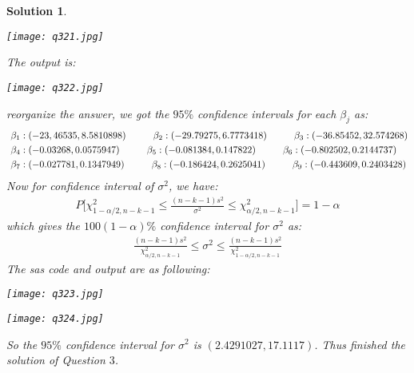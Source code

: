 \documentclass[11pt]{article}
\newtheorem{sol}{Solution}
\begin{document}
\begin{sol}
\begin{center}
		\texttt{[image: q321.jpg]}
	\end{center}
	The output is:
	\begin{center}
		\texttt{[image: q322.jpg]}
	\end{center}
	reorganize the answer, we got the $95\%$ confidence intervals for each $\beta_j$ as:
	\begin{align*}
		&\ \beta_1: (-23,46535, 8.5810898)\hskip 1cm \beta_2:  (-29.79275, 6.7773418) \hskip 1cm \beta_3: (-36.85452, 32.574268)\\
		&\ \beta_4: (-0.03268, 0.0575947)\hskip 1cm \beta_5: (-0.081384, 0.147822)\hskip 1cm 
		\beta_6: (-0.802502, 0.2144737)\\
		&\  \beta_7: (-0.027781, 0.1347949)\hskip 1cm \beta_8: (-0.186424, 0.2625041) \hskip 1cm \beta_9: (-0.443609, 0.2403428)
	\end{align*}
	Now for confidence interval of $\sigma^2$, we have:
	\begin{align*}
		P\Big[\chi^2_{1 - \alpha/2, n - k - 1}\leq \frac{(n - k - 1)s^2}{\sigma^2} \leq \chi^2_{\alpha/2, n - k - 1}\Big] = 1 - \alpha
	\end{align*}
	which gives the $100(1 - \alpha)\%$ confidence interval for $\sigma^2$ as:
	\begin{align*}
		\frac{(n - k - 1)s^2}{\chi^2_{\alpha/2, n - k - 1}} \leq \sigma^2 \leq \frac{(n -  k - 1)s^2}{\chi^2_{1 - \alpha/2, n - k - 1}}
	\end{align*}
	The sas code and output are as following:
	\begin{center}
		\texttt{[image: q323.jpg]}
	\end{center}
	\begin{center}
		\texttt{[image: q324.jpg]}
	\end{center}
	So the $95\%$ confidence interval for $\sigma^2$ is $(2.4291027, 17.1117)$.\vskip 2mm
	Thus finished the solution of Question $3$.
\end{sol}
\end{document}

